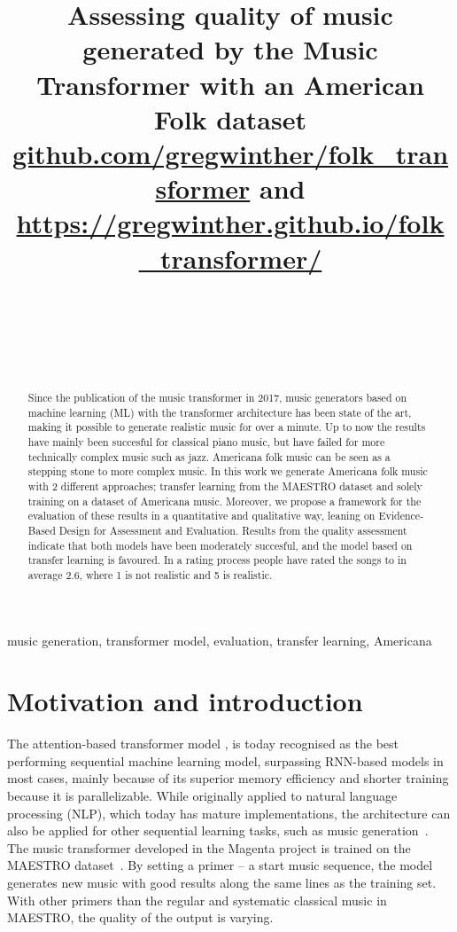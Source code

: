 \documentclass{IEEEtran}
\title{Assessing quality of music generated by the Music Transformer with an
American Folk dataset \\
\normalsize{\url{github.com/gregwinther/folk_transformer} and
\url{https://gregwinther.github.io/folk_transformer/}}}
\author{
    \IEEEauthorblockN{Sebastian G. Winther-Larsen} \\
    \IEEEauthorblockA{\textit{Center for Computing in Science Education,
        Department of Physics, University of Oslo} \\
    }
    \and
    \IEEEauthorblockN{Tom F.Hansen} \\
    \IEEEauthorblockA{\textit{Institute of Informatics, University of Oslo} \\ }
    \and
    \IEEEauthorblockN{Bjørn Iversen} \\
    \IEEEauthorblockA{\textit{Institute of Informatics, University of Oslo} \\ }
}
\begin{document}
\maketitle

\begin{abstract}
    Since the publication of the music transformer in 2017,
    music generators based on machine learning (ML) with the transformer architecture 
    has been state of the
    art, making it possible to generate realistic music for over a minute. Up to now
    the results have mainly been succesful for classical piano music, but have failed for
    more technically complex music such as jazz. Americana folk music can be seen
    as a stepping stone to more complex music. In this work we generate Americana
    folk music with 2 different approaches; transfer learning from the MAESTRO
    dataset and solely training on a dataset of Americana music.
    Moreover, we propose
    a framework for the evaluation of these results in a quantitative and
    qualitative way, leaning on Evidence-Based Design 
    for Assessment and Evaluation. Results from the quality
    assessment indicate that both models have been moderately succesful, and the
    model based on transfer learning is favoured. In a rating process people have
    rated the songs to in average 2.6, where 1 is not realistic and 5 is
    realistic.
\end{abstract}

\begin{IEEEkeywords}
    music generation, transformer model, evaluation,
    transfer learning, Americana
\end{IEEEkeywords}

\section{Motivation and introduction}

The attention-based transformer model \cite{vaswani2017attention}, is today
recognised as the best performing sequential machine learning model,
surpassing RNN-based models in most cases, mainly because of its
superior memory efficiency and shorter training because it is parallelizable.
While originally applied to natural language processing (NLP),
which today has mature implementations,
the architecture can also be applied for other sequential learning tasks,
such as music generation~\cite{huang2018music}. The music transformer
developed in the Magenta project is trained on the MAESTRO
dataset~\cite{maestrodataset}. By setting a primer – a start music sequence,
the model generates new music with good results along the same lines as the
training set. With other primers than the regular and systematic classical
music in MAESTRO, the quality of the output is varying.
\end{document}
